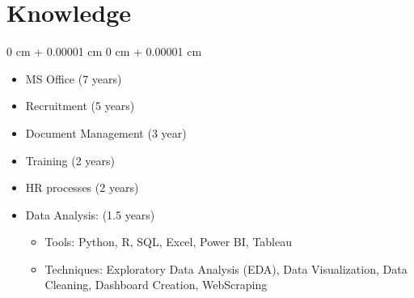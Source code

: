 \documentclass[10pt, a4paper]{article}
\newenvironment{highlightsforbulletentries}{
    \begin{itemize}[
        topsep=0.10 cm,
        parsep=0.10 cm,
        partopsep=0pt,
        itemsep=0pt,
        leftmargin=10pt
    ]
}{
    \end{itemize}
} %
\newenvironment{onecolentry}{
    \begin{adjustwidth}{
        0 cm + 0.00001 cm
    }{
        0 cm + 0.00001 cm
    }
}{
    \end{adjustwidth}
} %
\begin{document}
    \section{Knowledge}
        \begin{samepage}
            \begin{onecolentry}
                \begin{highlightsforbulletentries}
                \item  MS Office (7 years)
                \item  Recruitment (5 years)
                \item  Document Management (3 year)
                \item  Training (2 years)
                \item  HR processes (2 years)
                \item Data Analysis: (1.5 years)
                \begin{itemize}
                    \item  Tools: Python, R, SQL, Excel, Power BI, Tableau
                    \item Techniques: Exploratory Data Analysis (EDA), Data Visualization, Data Cleaning, Dashboard Creation, WebScraping
                \end{itemize}
                \end{highlightsforbulletentries}
            \end{onecolentry}
        \end{samepage} 
\end{document}

